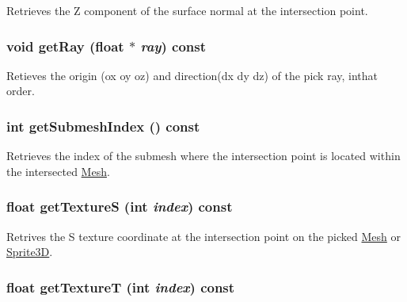 Retrieves the Z component of the surface normal at the intersection point. \hypertarget{classm3g_1_1RayIntersection_3f4d1f2f24c0dadab914014836e1b138}{
\subsubsection[{getRay}]{\setlength{\rightskip}{0pt plus 5cm}void getRay (float $\ast$ {\em ray}) const}}
\label{classm3g_1_1RayIntersection_3f4d1f2f24c0dadab914014836e1b138}


Retieves the origin (ox oy oz) and direction(dx dy dz) of the pick ray, inthat order. \hypertarget{classm3g_1_1RayIntersection_6a11c61d1a1fecc01f2f83463404a6b8}{
\subsubsection[{getSubmeshIndex}]{\setlength{\rightskip}{0pt plus 5cm}int getSubmeshIndex () const}}
\label{classm3g_1_1RayIntersection_6a11c61d1a1fecc01f2f83463404a6b8}


Retrieves the index of the submesh where the intersection point is located within the intersected \hyperlink{classm3g_1_1Mesh}{Mesh}. \hypertarget{classm3g_1_1RayIntersection_bc14e1d5a83d5fca608b1fbf772614d4}{
\subsubsection[{getTextureS}]{\setlength{\rightskip}{0pt plus 5cm}float getTextureS (int {\em index}) const}}
\label{classm3g_1_1RayIntersection_bc14e1d5a83d5fca608b1fbf772614d4}


Retrives the S texture coordinate at the intersection point on the picked \hyperlink{classm3g_1_1Mesh}{Mesh} or \hyperlink{classm3g_1_1Sprite3D}{Sprite3D}. \hypertarget{classm3g_1_1RayIntersection_843d5b907bb54a6f28571f0a0f14c932}{
\subsubsection[{getTextureT}]{\setlength{\rightskip}{0pt plus 5cm}float getTextureT (int {\em index}) const}}
\label{classm3g_1_1RayIntersection_843d5b907bb54a6f28571f0a0f14c932}



